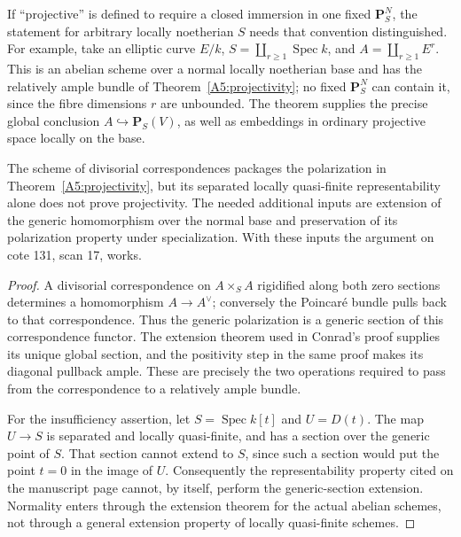 \begin{remark}
\label{A5:fixed-projective-space}
If ``projective'' is defined to require a closed immersion in one fixed
$\mathbf P^N_S$, the statement for arbitrary locally noetherian $S$ needs
that convention distinguished.  For example, take an elliptic curve $E/k$,
$S=\coprod_{r\geq1}\operatorname{Spec}k$, and
$A=\coprod_{r\geq1}E^r$.  This is an abelian scheme over a normal locally
noetherian base and has the relatively ample bundle of
Theorem~\ref{A5:projectivity}; no fixed $\mathbf P^N_S$ can contain it,
since the fibre dimensions $r$ are unbounded.  The theorem supplies the
precise global conclusion $A\hookrightarrow\mathbf P_S(V)$, as well as
embeddings in ordinary projective space locally on the base.
\end{remark}

\begin{proposition}
\label{A5:correspondences}
The scheme of divisorial correspondences packages the polarization in
Theorem~\ref{A5:projectivity}, but its separated locally quasi-finite
representability alone does not prove projectivity.  The needed additional
inputs are extension of the generic homomorphism over the normal base
and preservation of its polarization property under specialization.
With these inputs the argument on cote 131, scan 17, works.
\end{proposition}
\begin{proof}
A divisorial correspondence on $A\times_S A$ rigidified along both zero
sections determines a homomorphism $A\to A^\vee$; conversely the Poincar\'e
bundle pulls back to that correspondence.  Thus the generic polarization
is a generic section of this correspondence functor.  The extension
theorem used in Conrad's proof supplies its unique global section, and
the positivity step in the same proof makes its diagonal pullback ample.
These are precisely the two operations required to pass from the
correspondence to a relatively ample bundle.

For the insufficiency assertion, let $S=\operatorname{Spec}k[t]$ and
$U=D(t)$.  The map $U\to S$ is separated and locally quasi-finite, and
has a section over the generic point of $S$.  That section cannot extend
to $S$, since such a section would put the point $t=0$ in the image of
$U$.  Consequently the representability property cited on the manuscript
page cannot, by itself, perform the generic-section extension.  Normality
enters through the extension theorem for the actual abelian schemes, not
through a general extension property of locally quasi-finite schemes.
\end{proof}

